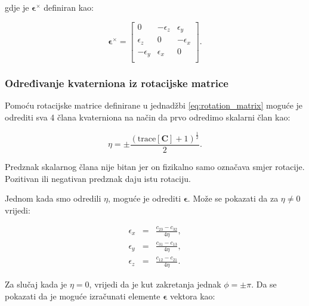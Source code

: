 \documentclass[times, utf8, diplomski, numeric]{templates/template}
\begin{document}
{{{            gdje je $\boldsymbol\epsilon^{\times}$ definiran kao:

            \begin{equation}
                \boldsymbol\epsilon^{\times} =
                \begin{bmatrix}
                    0 & -\epsilon_{z} & \epsilon_{y} \\
                    \epsilon_{z} & 0 & -\epsilon_{x} \\
                    -\epsilon_{y} & \epsilon_{x} & 0 \\
                \end{bmatrix}
                .
            \end{equation}

            \subsubsection{Određivanje kvaterniona iz rotacijske matrice}{
                Pomoću rotacijske matrice definirane u jednadžbi \ref{eq:rotation_matrix} moguće je odrediti sva 4 člana kvaterniona na način da prvo odredimo skalarni član kao:
                
                \begin{equation}
                    \eta = \pm\frac{(\text{trace}[\textbf{C}] + 1)^{\frac{1}{2}}}{2}.
                \end{equation}

                Predznak skalarnog člana nije bitan jer on fizikalno samo označava smjer rotacije. Pozitivan ili negativan predznak daju istu rotaciju.

                Jednom kada smo odredili $\eta$, moguće je odrediti $\boldsymbol\epsilon$. Može se pokazati da za $\eta \neq 0$ vrijedi:

                \begin{equation}
                \begin{array}{rcl}
                    \epsilon_{x} & = & \frac{c_{23} - c_{32}}{4\eta}, \\
                    \epsilon_{y} & = & \frac{c_{31} - c_{13}}{4\eta}, \\
                    \epsilon_{z} & = & \frac{c_{12} - c_{21}}{4\eta}.
                \end{array}
                \end{equation}

                Za slučaj kada je $\eta=0$, vrijedi da je kut zakretanja jednak $\phi=\pm\pi$. Da se pokazati da je moguće izračunati elemente $\boldsymbol\epsilon$ vektora kao:

}}}}
\end{document}
